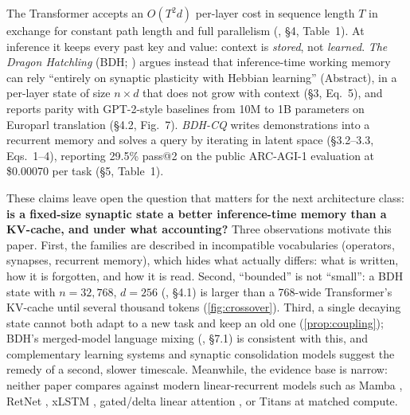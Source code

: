\documentclass[10pt]{article}
\theoremstyle{remark}
\begin{document}
The Transformer \citep{vaswani2017attention} accepts an $O(T^2 d)$ per-layer cost in sequence length $T$ in
exchange for constant path length and full parallelism (\citealp{vaswani2017attention}, \S4, Table~1). At inference
it keeps every past key and value: context is \emph{stored}, not \emph{learned}. \emph{The Dragon Hatchling}
(BDH; \citealp{kosowski2025bdh}) argues instead that inference-time working memory can rely ``entirely on synaptic
plasticity with Hebbian learning'' (Abstract), in a per-layer state of size $n\times d$ that does not grow with
context (\S3, Eq.~5), and reports parity with GPT-2-style baselines from 10M to 1B parameters on Europarl
translation (\S4.2, Fig.~7). \emph{BDH-CQ} \citep{engdahl2026bdhcq} writes demonstrations into a recurrent memory
and solves a query by iterating in latent space (\S3.2--3.3, Eqs.~1--4), reporting 29.5\% pass@2 on the public
ARC-AGI-1 evaluation at \$0.00070 per task (\S5, Table~1).

These claims leave open the question that matters for the next architecture class: \textbf{is a fixed-size
synaptic state a better inference-time memory than a KV-cache, and under what accounting?} Three observations
motivate this paper. First, the families are described in incompatible vocabularies (operators, synapses,
recurrent memory), which hides what actually differs: what is written, how it is forgotten, and how it is read.
Second, ``bounded'' is not ``small'': a BDH state with $n=32{,}768$, $d=256$ (\citealp{kosowski2025bdh}, \S4.1) is
larger than a 768-wide Transformer's KV-cache until several thousand tokens (\cref{fig:crossover}). Third, a single
decaying state cannot both adapt to a new task and keep an old one (\cref{prop:coupling}); BDH's merged-model language
mixing (\citealp{kosowski2025bdh}, \S7.1) is consistent with this, and complementary learning systems
\citep{mcclelland1995cls,kumaran2016cls} and synaptic consolidation models \citep{fusi2005cascade,benna2016consolidation}
suggest the remedy of a second, slower timescale. Meanwhile, the evidence base is narrow: neither paper compares
against modern linear-recurrent models such as Mamba \citep{gu2023mamba}, RetNet \citep{sun2023retnet}, xLSTM
\citep{beck2024xlstm}, gated/delta linear attention \citep{yang2024gla,yang2024deltanet,yang2025gateddelta}, or
Titans \citep{behrouz2025titans} at matched compute.
\end{document}
